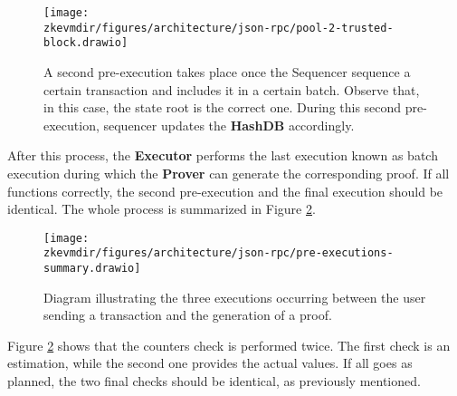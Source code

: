 \begin{figure}[H]
\centering
\texttt{[image: \\zkevmdir/figures/architecture/json-rpc/pool-2-trusted-block.drawio]}
\caption{A second pre-execution takes place once the Sequencer sequence a certain transaction and includes it in a certain batch. Observe that, in this case, the state root is the correct one. During this second pre-execution, sequencer updates the \textbf{HashDB} accordingly. }
\label{fig:seq-transactions-pool}
\end{figure}

After this process, the \textbf{Executor} performs the last execution known as batch execution during which the \textbf{Prover} can generate the corresponding proof. If all functions correctly, the second pre-execution and the final execution should be identical. The whole process is summarized in Figure \ref{fig:pre-exec-summary}.


\begin{figure}[H]
\centering
\texttt{[image: \\zkevmdir/figures/architecture/json-rpc/pre-executions-summary.drawio]}
\caption{Diagram illustrating the three executions occurring between the user sending a transaction and the generation of a proof.}
\label{fig:pre-exec-summary}
\end{figure}

Figure \ref{fig:pre-exec-summary} shows that the counters check is performed twice. The first check is an estimation, while the second one provides the actual values. If all goes as planned, the two final checks should be identical, as previously mentioned.


